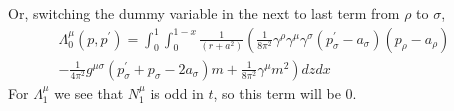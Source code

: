 Or, switching the dummy variable in the next to last term from $\rho$ to $\sigma$,
\begin{equation}\begin{aligned}
\Lambda_{0}^{\mu}\left(p, p^{\prime}\right)=\int_{0}^{1} \int_{0}^{1-x} \frac{1}{\left(r+a^{2}\right)}\left(\frac{1}{8 \pi^{2}} \gamma^{\rho} \gamma^{\mu} \gamma^{\sigma}\left(p_{\sigma}^{\prime}-a_{\sigma}\right)\left(p_{\rho}-a_{\rho}\right)\right.& \\
\left.-\frac{1}{4 \pi^{2}} g^{\mu \sigma}\left(p_{\sigma}^{\prime}+p_{\sigma}-2 a_{\sigma}\right) m+\frac{1}{8 \pi^{2}} \gamma^{\mu} m^{2}\right) d z d x
\end{aligned}\end{equation}
For $\Lambda_1^{\mu}$ we see that $N_1^{\mu}$ is odd in $t$, so this term will be 0.

